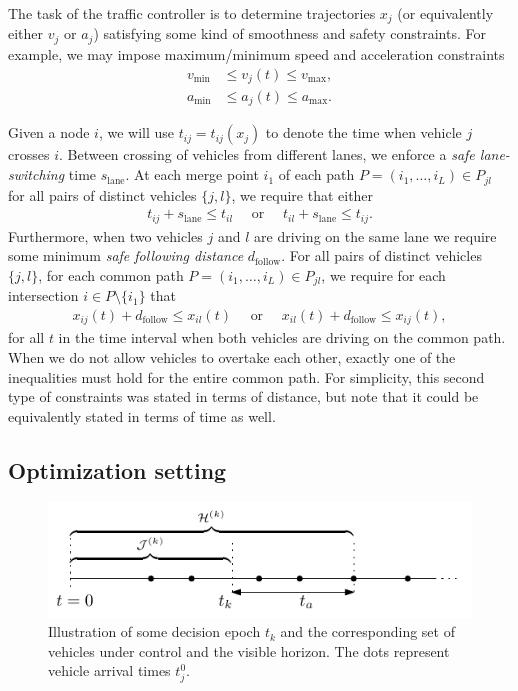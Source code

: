 \documentclass{article}
\theoremstyle{definition}
\theoremstyle{plain}
\begin{document}
The task of the traffic controller is to determine trajectories $x_{j}$ (or
equivalently either $v_{j}$ or $a_{j}$) satisfying some kind of smoothness and
safety constraints. For example, we may impose maximum/minimum speed and
acceleration constraints
\begin{align}
    v_\text{min} & \leq v_j(t) \leq v_\text{max} , \\
    a_\text{min} & \leq a_j(t) \leq a_\text{max} .
\end{align}


Given a node $i$, we will use $t_{ij} = t_{ij}(x_{j})$ to denote the time when
vehicle $j$ crosses $i$. Between crossing of vehicles from different lanes, we
enforce a \textit{safe lane-switching} time $s_{\text{lane}}$. At each merge
point $i_{1}$ of each path $P = (i_{1}, \dots, i_{L}) \in P_{jl}$ for all pairs
of distinct vehicles $\{j,l\}$, we require that either
\begin{align}
  t_{ij} + s_{\text{lane}} \leq t_{il} \quad \text{ or } \quad t_{il} + s_{\text{lane}} \leq t_{ij} .
\end{align}
Furthermore, when two vehicles $j$ and $l$ are driving on the same lane we require some
minimum \textit{safe following distance} $d_{\text{follow}}$. For all pairs of
distinct vehicles $\{j,l\}$, for each common path
$P = (i_{1}, \dots, i_{L}) \in P_{jl}$, we require for each intersection
$i \in P \setminus \{ i_{1} \}$ that
\begin{align}
  \label{eq:following-distance-constraint}
  x_{ij}(t) + d_{\text{follow}} \leq x_{il}(t) \quad \text{ or } \quad x_{il}(t) + d_{\text{follow}} \leq x_{ij}(t) ,
\end{align}
for all $t$ in the time interval when both vehicles are driving on the common
path. When we do not allow vehicles to overtake each other, exactly one of the
inequalities must hold for the entire common path. For simplicity, this second
type of constraints was stated in terms of distance, but note that it could be
equivalently stated in terms of time as well.

\subsection{Optimization setting}

\begin{figure}
  \centering
  \includegraphics[width=1.0\textwidth]{figures/sequential-decision-process.pdf}
  \caption{Illustration of some decision epoch $t_{k}$ and the corresponding set
    of vehicles under control and the visible horizon. The dots represent vehicle
    arrival times $t_{j}^{0}$.}
  \label{fig:sequential-decision-process}
\end{figure}
\end{document}
